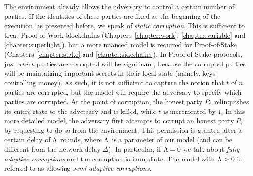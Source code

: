 The environment already allows the adversary to control a certain number
of parties. If the identities of these parties are fixed at the beginning of
the execution, as presented before, we speak of
\emph{static corruption}. This is sufficient to treat
Proof-of-Work blockchains (Chapters~\ref{chapter:work}, \ref{chapter:variable}
and \ref{chapter:superlight}), but a more nuanced model is required for
Proof-of-Stake (Chapters~\ref{chapter:stake} and \ref{chapter:sidechains}).
In Proof-of-Stake protocols, just \emph{which} parties are
corrupted will be significant, because the corrupted parties will be maintaining
important secrets in their local state (namely, keys controlling money). As
such, it is not sufficient to capture the notion that $t$ of $n$ parties are
corrupted, but the model will require the adversary to specify which parties are
corrupted. At the point of corruption, the honest party $P_i$ relinquishes
its entire state to the adversary and is killed, while $t$ is incremented by
$1$. In this more detailed model, the adversary first attempts to corrupt an
honest party $P_i$ by requesting to do so from the environment. This permission
is granted after a certain delay of $\Lambda$ rounds, where $\Lambda$ is a
parameter of our model (and can be different from the network delay $\Delta$).
In particular, if $\Lambda=0$ we talk about \emph{fully adaptive
corruptions} and the corruption is immediate.
The model with $\Lambda>0$ is referred to as allowing \emph{semi-adaptive
corruptions}.

